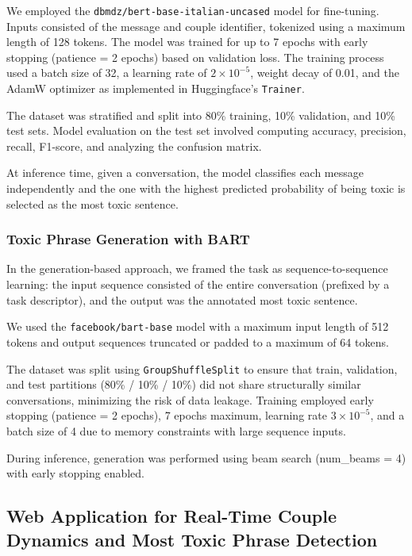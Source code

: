 \documentclass[conference]{IEEEtran}
\begin{document}
We employed the \texttt{dbmdz/bert-base-italian-uncased} model for fine-tuning. Inputs consisted of the message and couple identifier, tokenized using a maximum length of 128 tokens. The model was trained for up to 7 epochs with early stopping (patience = 2 epochs) based on validation loss. The training process used a batch size of 32, a learning rate of $2 \times 10^{-5}$, weight decay of 0.01, and the AdamW optimizer as implemented in Huggingface's \texttt{Trainer}. 

The dataset was stratified and split into 80\% training, 10\% validation, and 10\% test sets. Model evaluation on the test set involved computing accuracy, precision, recall, F1-score, and analyzing the confusion matrix.

At inference time, given a conversation, the model classifies each message independently and the one with the highest predicted probability of being toxic is selected as the most toxic sentence.

\subsubsection{Toxic Phrase Generation with BART}

In the generation-based approach, we framed the task as sequence-to-sequence learning: the input sequence consisted of the entire conversation (prefixed by a task descriptor), and the output was the annotated most toxic sentence. 

We used the \texttt{facebook/bart-base} model with a maximum input length of 512 tokens and output sequences truncated or padded to a maximum of 64 tokens.

The dataset was split using \texttt{GroupShuffleSplit} to ensure that train, validation, and test partitions (80\% / 10\% / 10\%) did not share structurally similar conversations, minimizing the risk of data leakage. Training employed early stopping (patience = 2 epochs), 7 epochs maximum, learning rate $3 \times 10^{-5}$, and a batch size of 4 due to memory constraints with large sequence inputs.

During inference, generation was performed using beam search (num\_beams = 4) with early stopping enabled. 

\subsection{Web Application for Real-Time Couple Dynamics and Most Toxic Phrase Detection}
\end{document}
